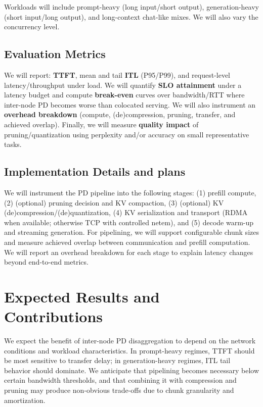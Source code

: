 \documentclass{article} %
\begin{document}
Workloads will include prompt-heavy (long input/short output), generation-heavy (short input/long output), and long-context chat-like mixes. We will also vary the concurrency level.

\subsection{Evaluation Metrics}

We will report: \textbf{TTFT}, mean and tail \textbf{ITL} (P95/P99), and request-level latency/throughput under load. We will quantify \textbf{SLO attainment} under a latency budget and compute \textbf{break-even} curves over bandwidth/RTT where inter-node PD becomes worse than colocated serving. We will also instrument an \textbf{overhead breakdown} (compute, (de)compression, pruning, transfer, and achieved overlap). Finally, we will measure \textbf{quality impact} of pruning/quantization using perplexity and/or accuracy on small representative tasks.

\subsection{Implementation Details and plans}
We will instrument the PD pipeline into the following stages:
(1) prefill compute,
(2) (optional) pruning decision and KV compaction,
(3) (optional) KV (de)compression/(de)quantization,
(4) KV serialization and transport (RDMA when available; otherwise TCP with controlled netem),
and (5) decode warm-up and streaming generation.
For pipelining, we will support configurable chunk sizes and measure achieved overlap between communication and prefill computation.
We will report an overhead breakdown for each stage to explain latency changes beyond end-to-end metrics.

\section{Expected Results and Contributions}

We expect the benefit of inter-node PD disaggregation to depend on the network conditions and workload characteristics. In prompt-heavy regimes, TTFT should be most sensitive to transfer delay; in generation-heavy regimes, ITL tail behavior should dominate. We anticipate that pipelining becomes necessary below certain bandwidth thresholds, and that combining it with compression and pruning may produce non-obvious trade-offs due to chunk granularity and amortization.
\end{document}
